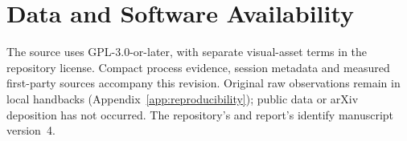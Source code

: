 \section{Data and Software Availability}
The source uses GPL-3.0-or-later, with separate visual-asset terms in the
repository license. Compact process evidence, session metadata and measured
first-party sources accompany this revision. Original raw observations remain
in local handbacks (Appendix~\ref{app:reproducibility}); public data or arXiv
deposition has not occurred. The repository's  and report's
 identify manuscript version~4.
